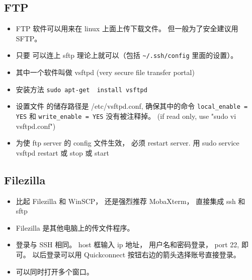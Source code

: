 
\subsection{FTP}
\begin{itemize}
\item FTP 软件可以用来在 linux 上面上传下载文件。 但一般为了安全建议用 SFTP。
\item 只要  可以连上 sftp 理论上就可以（包括 \verb|~/.ssh/config| 里面的设置）。
\item 其中一个软件叫做 vsftpd (very secure file transfer portal)
\item 安装方法 \verb`sudo apt-get  install vsftpd`
\item 设置文件 的储存路径是 /etc/vsftpd.conf, 确保其中的命令 \verb|local_enable = YES| 和 \verb|write_enable = YES|  没有被注释掉。
(if read only, use "sudo vi vsftpd.conf")
\item 为使 ftp server 的 config 文件生效， 必须 restart server. 用 sudo service vsftpd restart 或 stop 或 start
\end{itemize}

\subsection{Filezilla}
\begin{itemize}
\item 比起 Filezilla 和 WinSCP， 还是强烈推荐 MobaXterm， 直接集成 ssh 和 sftp
\item Filezilla 是其他电脑上的传文件程序。
\item 登录与 SSH 相同。 host 框输入 ip 地址， 用户名和密码登录， port 22, 即可。 以后登录可以用 Quickconnect 按钮右边的箭头选择账号直接登录。
\item 可以同时打开多个窗口。
\end{itemize}

